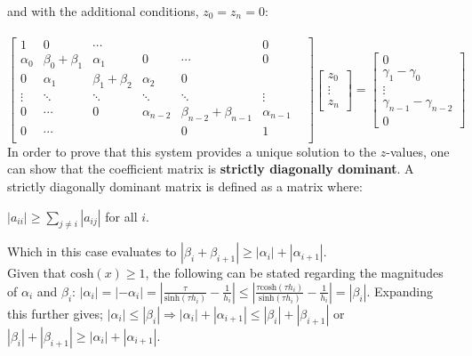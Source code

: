 \documentclass{article}
\begin{document}
  and with the additional conditions, $z_0 = z_n = 0$: \\ \ \\
  $
  \begin{bmatrix}
  1 & 0 & \cdots & & & 0 \\
  \alpha_0 & \beta_0 + \beta_1 & \alpha_1 & 0 & \cdots & 0 \\
  0 & \alpha_1 & \beta_1 + \beta_2 & \alpha_2 & 0 & \\
  \vdots & \ddots & \ddots & \ddots & \ddots &\vdots \\
  0 &  \cdots & 0 & \alpha_{n-2} & \beta_{n-2} + \beta_{n-1} & \alpha_{n-1} & \\
  0 & \cdots &  & & 0 & 1 \\
  \end{bmatrix}
  \begin{bmatrix}
    z_0 \\
    \vdots \\
    z_n
  \end{bmatrix}
  =
  \begin{bmatrix}
    0\\
   \gamma_1 - \gamma_0\\
    \vdots \\
    \gamma_{n-1} - \gamma_{n-2}\\
    0
  \end{bmatrix}
  $ \\

  In order to prove that this system provides a unique solution to the
  $z$-values, one can show that the coefficient matrix is \textbf{strictly
  diagonally dominant}. A strictly diagonally dominant matrix is defined as a
  matrix where:
  \begin{center}
    $ |a_{ii}| \geq \sum\limits_{j \neq i}{|a_{ij}|}$ for all $i$.
  \end{center}
  Which in this case evaluates to $|\beta_i + \beta_{i+1}| \geq |\alpha_i| +
  |\alpha_{i+1}|$. \\

  Given that $\mathrm{cosh}(x) \geq 1$, the following can be stated regarding
  the magnitudes of $\alpha_i$ and $\beta_i$:
  $
    |\alpha_i| = |-\alpha_i| = |\frac{\tau}{\mathrm{sinh}(\tau h_i)}-
    \frac{1}{h_i} | \leq |\frac{\tau \mathrm{cosh}(\tau h_i)}{\mathrm{sinh}(\tau h_i)} -
    \frac{1}{h_i}| = |\beta_i|
  $.
  Expanding this further gives;
  $
    |\alpha_i| \leq |\beta_i| \Rightarrow |\alpha_i| + |\alpha_{i+1}| \leq
    |\beta_i| + |\beta_{i+1}|
  $
  or
  $
    |\beta_i| + |\beta_{i+1}| \geq |\alpha_i| + |\alpha_{i+1}|
  $. \\
\end{document}
